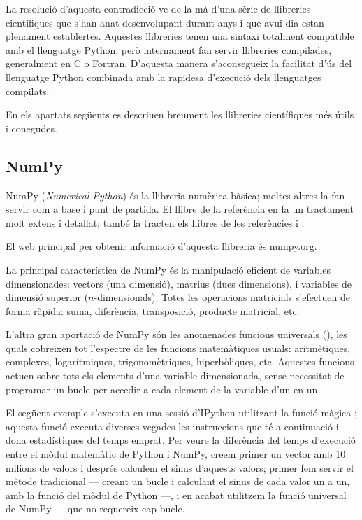 La resolució d'aquesta  contradicció ve de la mà d'una sèrie de llibreries científiques que s'han anat desenvolupant durant anys i que avui dia estan plenament establertes. Aquestes llibreries tenen una sintaxi totalment compatible amb el llenguatge Python, però internament fan servir llibreries compilades, generalment en C o Fortran. D'aquesta manera s'aconsegueix la facilitat d'ús del llenguatge Python combinada amb la rapidesa d'execució dels llenguatges compilats.

En els apartats següents es descriuen breument  les llibreries científiques més útils i conegudes.

\subsection{NumPy}

NumPy  (\textit{Numerical Python}) és la llibreria numèrica bàsica; moltes altres la  fan servir com a base i punt de partida. El llibre de la referència \cite{VAN} en fa un tractament molt extens i detallat; també la tracten els llibres de les referències \cite{JOH} i \cite{HIL}.

El  web principal per obtenir informació d'aquesta llibreria és \href{https://numpy.org/}{numpy.org}.

La principal característica de NumPy és la manipulació eficient de variables dimensionades: vectors (una dimensió), matrius (dues dimensions), i variables de dimensió superior ($n$-dimensionals). Totes les operacions matricials s'efectuen de forma ràpida: suma, diferència, transposició, producte matricial, etc.

L'altra gran aportació de NumPy són les anomenades funcions universals (), les quals cobreixen tot l'espectre de les funcions matemàtiques usuals: aritmètiques, complexes, logarítmiques, trigonomètriques, hiperbòliques, etc. Aquestes funcions actuen sobre tots els elements d'una variable dimensionada, sense necessitat de programar un bucle per accedir a cada element de la variable d'un en un. 

El següent exemple s'executa en una sessió d'IPython utilitzant la funció màgica ; aquesta funció executa diverses vegades les instruccions que té a continuació i dona estadístiques del temps emprat. Per veure la diferència del temps d'execució entre el mòdul matemàtic  de Python  i NumPy, creem primer un vector amb 10 milions de valors i després calculem el sinus d'aquests valors; primer fem servir el mètode tradicional --- creant un bucle i calculant el sinus de cada valor un a un, amb la funció  del mòdul  de Python ---, i en acabat utilitzem la funció universal  de NumPy --- que no requereix cap bucle.

